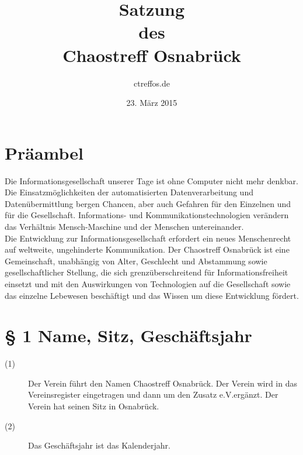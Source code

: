 \documentclass[12pt,paper=a4,ngerman]{scrreprt}
\title{Satzung\\des\\Chaostreff Osnabrück} \author{ctreffos.de}
\date{23. März 2015}
\begin{document}
\maketitle
\tableofcontents
\newpage
\section{Präambel}
Die Informationsgesellschaft unserer Tage ist ohne Computer nicht mehr denkbar. Die Einsatzmöglichkeiten der automatisierten Datenverarbeitung und Datenübermittlung bergen Chancen, aber auch Gefahren für den Einzelnen und für die Gesellschaft. Informations- und Kommunikationstechnologien verändern das Verhältnis Mensch-Maschine und der Menschen untereinander.\\
Die Entwicklung zur Informationsgesellschaft erfordert ein neues Menschenrecht auf weltweite, ungehinderte Kommunikation. Der Chaostreff Osnabrück ist eine Gemeinschaft, unabhängig von Alter, Geschlecht und Abstammung sowie gesellschaftlicher Stellung, die sich grenzüberschreitend für Informationsfreiheit einsetzt und mit den Auswirkungen von Technologien auf die Gesellschaft sowie das einzelne Lebewesen beschäftigt und das Wissen um diese Entwicklung fördert.
\section{\S{} 1 Name, Sitz, Geschäftsjahr}
\begin{description}
	\item[(1)] Der Verein führt den Namen \grqq Chaostreff Osnabrück\grqq. Der Verein wird in das Vereinsregister eingetragen und dann um den Zusatz \grqq e.V.\grqq ergänzt. Der Verein hat seinen Sitz in Osnabrück.
	\item[(2)] Das Geschäftsjahr ist das Kalenderjahr.
\end{description}
\end{document}
